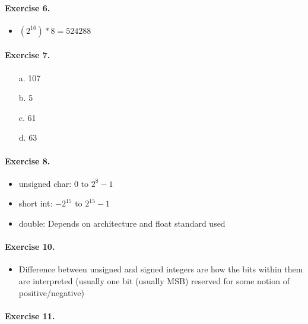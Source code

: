 \documentclass[12pt]{article}
\begin{document}
\paragraph{Exercise 6.}
\begin{itemize}
    \item 
    $(2^{16}) * 8 = 524288$
\end{itemize}

\paragraph{Exercise 7.}

\begin{itemize}
    \item [a.]
    107

    \item [b.]
    5

    \item [c.]
    61

    \item [d.]
    63
\end{itemize}

\paragraph{Exercise 8.}

\begin{itemize}
    \item 
    unsigned char: $0 \text{ to } 2^{8} - 1$

    \item
    short int: $-2^{15} \text{ to } 2^{15} - 1$

    \item 
    double: Depends on architecture and float standard used

\end{itemize}

\paragraph{Exercise 10.}

\begin{itemize}
    \item 
    Difference between unsigned and signed integers are how the bits within them are interpreted (usually one bit (usually MSB) reserved for some notion of positive/negative)
\end{itemize}

\paragraph{Exercise 11.}
\end{document}
